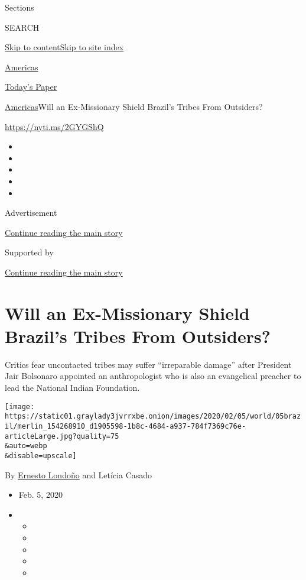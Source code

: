 Sections

SEARCH

\protect\hyperlink{site-content}{Skip to
content}\protect\hyperlink{site-index}{Skip to site index}

\href{https://www.nytimes3xbfgragh.onion/section/world/americas}{Americas}

\href{https://myaccount.nytimes3xbfgragh.onion/auth/login?response_type=cookie\&client_id=vi}{}

\href{https://www.nytimes3xbfgragh.onion/section/todayspaper}{Today's
Paper}

\href{/section/world/americas}{Americas}\textbar{}Will an Ex-Missionary
Shield Brazil's Tribes From Outsiders?

\url{https://nyti.ms/2GYGShQ}

\begin{itemize}
\item
\item
\item
\item
\item
\end{itemize}

Advertisement

\protect\hyperlink{after-top}{Continue reading the main story}

Supported by

\protect\hyperlink{after-sponsor}{Continue reading the main story}

\hypertarget{will-an-ex-missionary-shield-brazils-tribes-from-outsiders}{%
\section{Will an Ex-Missionary Shield Brazil's Tribes From
Outsiders?}\label{will-an-ex-missionary-shield-brazils-tribes-from-outsiders}}

Critics fear uncontacted tribes may suffer ``irreparable damage'' after
President Jair Bolsonaro appointed an anthropologist who is also an
evangelical preacher to lead the National Indian Foundation.

\texttt{[image: https://static01.graylady3jvrrxbe.onion/images/2020/02/05/world/05brazil/merlin\_154268910\_d1905598-1b8c-4684-a937-784f7369c76e-articleLarge.jpg?quality=75\\\&auto=webp\\\&disable=upscale]}

By \href{https://www.nytimes3xbfgragh.onion/by/ernesto-londono}{Ernesto
Londoño} and Letícia Casado

\begin{itemize}
\item
  Feb. 5, 2020
\item
  \begin{itemize}
  \item
  \item
  \item
  \item
  \item
  \end{itemize}
\end{itemize}

